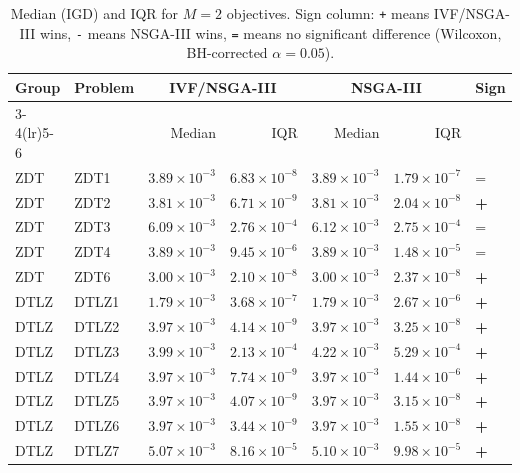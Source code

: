 \begin{table}[t]
\centering
\caption{Median (IGD) and IQR for $M=2$ objectives. Sign column: \texttt{+} means IVF/NSGA-III wins, \texttt{-} means NSGA-III wins, \texttt{=} means no significant difference (Wilcoxon, BH-corrected $\alpha=0.05$).}
\label{tab:igd_m2_ivfnsgaiii}
\scriptsize
\begin{tabular}{llrrrrl}
\toprule
Group & Problem & \multicolumn{2}{c}{IVF/NSGA-III} & \multicolumn{2}{c}{NSGA-III} & Sign \\
\cmidrule(lr){3-4}\cmidrule(lr){5-6}
 & & Median & IQR & Median & IQR & \\
\midrule
ZDT & ZDT1 & $3.89\!\times\!10^{-3}$ & $6.83\!\times\!10^{-8}$ & $3.89\!\times\!10^{-3}$ & $1.79\!\times\!10^{-7}$ & = \\
ZDT & ZDT2 & $3.81\!\times\!10^{-3}$ & $6.71\!\times\!10^{-9}$ & $3.81\!\times\!10^{-3}$ & $2.04\!\times\!10^{-8}$ & \textbf{+} \\
ZDT & ZDT3 & $6.09\!\times\!10^{-3}$ & $2.76\!\times\!10^{-4}$ & $6.12\!\times\!10^{-3}$ & $2.75\!\times\!10^{-4}$ & = \\
ZDT & ZDT4 & $3.89\!\times\!10^{-3}$ & $9.45\!\times\!10^{-6}$ & $3.89\!\times\!10^{-3}$ & $1.48\!\times\!10^{-5}$ & = \\
ZDT & ZDT6 & $3.00\!\times\!10^{-3}$ & $2.10\!\times\!10^{-8}$ & $3.00\!\times\!10^{-3}$ & $2.37\!\times\!10^{-8}$ & \textbf{+} \\
\addlinespace
DTLZ & DTLZ1 & $1.79\!\times\!10^{-3}$ & $3.68\!\times\!10^{-7}$ & $1.79\!\times\!10^{-3}$ & $2.67\!\times\!10^{-6}$ & \textbf{+} \\
DTLZ & DTLZ2 & $3.97\!\times\!10^{-3}$ & $4.14\!\times\!10^{-9}$ & $3.97\!\times\!10^{-3}$ & $3.25\!\times\!10^{-8}$ & \textbf{+} \\
DTLZ & DTLZ3 & $3.99\!\times\!10^{-3}$ & $2.13\!\times\!10^{-4}$ & $4.22\!\times\!10^{-3}$ & $5.29\!\times\!10^{-4}$ & \textbf{+} \\
DTLZ & DTLZ4 & $3.97\!\times\!10^{-3}$ & $7.74\!\times\!10^{-9}$ & $3.97\!\times\!10^{-3}$ & $1.44\!\times\!10^{-6}$ & \textbf{+} \\
DTLZ & DTLZ5 & $3.97\!\times\!10^{-3}$ & $4.07\!\times\!10^{-9}$ & $3.97\!\times\!10^{-3}$ & $3.15\!\times\!10^{-8}$ & \textbf{+} \\
DTLZ & DTLZ6 & $3.97\!\times\!10^{-3}$ & $3.44\!\times\!10^{-9}$ & $3.97\!\times\!10^{-3}$ & $1.55\!\times\!10^{-8}$ & \textbf{+} \\
DTLZ & DTLZ7 & $5.07\!\times\!10^{-3}$ & $8.16\!\times\!10^{-5}$ & $5.10\!\times\!10^{-3}$ & $9.98\!\times\!10^{-5}$ & \textbf{+} \\

\end{tabular}
\end{table}
